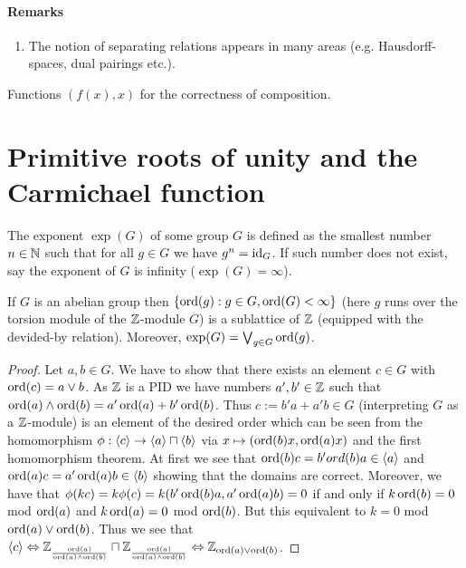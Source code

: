 \documentclass[8pt,a4paper]{article}
\begin{document}
\paragraph{Remarks}
\begin{enumerate}
\item The notion of separating relations appears in many areas
  (e.g. Hausdorff-spaces, dual pairings etc.).
\end{enumerate}



Functions $(f(x),x)$ for the correctness of composition.

\section{Primitive roots of unity and the Carmichael function}

\begin{definition}
    The exponent $\exp(G)$ of some group $G$ is defined as the smallest number $n\in\mathbb{N}$ such that for all $g\in G$ we have $g^n=\mathop\mathrm{id}\nolimits_G$. If such number does not exist, say the exponent of $G$ is infinity ($\exp(G)=\infty$).
\end{definition}

\begin{lemma}
    If $G$ is an abelian group then $\{\mathop\mathrm{ord}(g):g\in G, \mathop\mathrm{ord}(G)<\infty\}$ (here $g$ runs over the torsion module of the $\mathbb{Z}$-module $G$) is a sublattice of $\mathbb{Z}$ (equipped with the devided-by relation). Moreover, $\exp(G)=\mathop\mathrm{\bigvee}_{g\in G}{\mathop\mathrm{ord}(g)}$.
\end{lemma}

\begin{proof}
    Let $a,b\in G$. We have to show that there exists an element $c\in G$ with $\mathop\mathrm{ord}(c)=a\vee b$. As $\mathbb{Z}$ is a PID we have numbers $a',b'\in\mathbb{Z}$ such that $\mathop\mathrm{ord}(a)\wedge\mathop\mathrm{ord}(b)=a'\mathop\mathrm{ord}(a)+b'\mathop\mathrm{ord}(b)$. Thus $c:=b'a+a'b\in G$ (interpreting $G$ as a $\mathbb{Z}$-module) is an element of the desired order which can be seen from the homomorphism $\phi:\gen{c}\to \gen{a}\times\gen{b}$ via $x\mapsto (\mathop\mathrm{ord}(b)x,\mathop\mathrm{ord}(a)x)$ and the first homomorphism theorem.
    At first we see that $\ord(b)c=b'ord(b)a\in\gen{a}$ and $\ord(a)c=a'\ord(a)b\in\gen{b}$ showing that the domains are correct.
    Moreover, we have that $\phi(kc)=k\phi(c)=k(b'\mathop\mathrm{ord}(b)a,a'\mathop\mathrm{ord}(a)b)=0$ if and only if $k\mathop\mathrm{ord}(b)=0$ mod $\mathop\mathrm{ord}(a)$ and $k\mathop\mathrm{ord}(a)=0$ mod $\mathop\mathrm{ord}(b)$. But this equivalent to $k=0$ mod $\mathop\mathrm{ord}(a)\vee\mathop\mathrm{ord}(b)$. Thus we see that $\gen{c} \iso  \ints_{\frac{\ord(a)}{\ord(a)\meet\ord(b)}}\times\ints_{\frac{\ord(a)}{\ord(a)\meet\ord(b)}} \iso \ints_{\ord(a)\join\ord(b)}$.
\end{proof}
\end{document}
